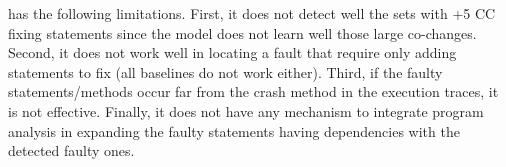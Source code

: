 
\vspace{3pt}
 {\tool} has the following
limitations. First, it does not detect well the sets with +5 CC fixing
statements since the model does not learn well those large
co-changes. Second, it does not work well in locating a fault that
require only adding statements to fix (all baselines do not
work either).
Third, if the faulty statements/methods occur far from the crash
method in the execution traces, it is not effective.
Finally, it does not have any mechanism to integrate program analysis
in expanding the faulty statements having dependencies with the
detected faulty ones.



